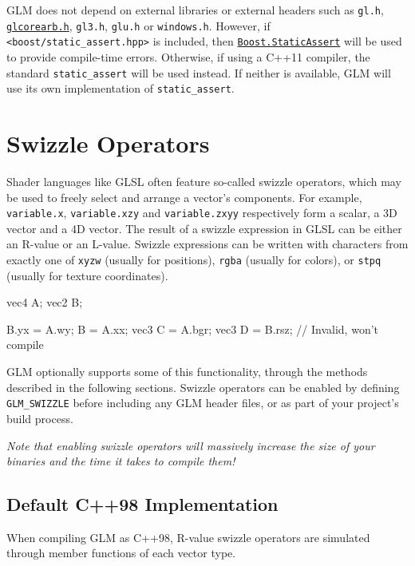\documentclass{scrartcl}
\numberwithin{figure}{subsection}
\begin{document}
GLM does not depend on external libraries or external headers such as \verb|gl.h|, \href{http://www.opengl.org/registry/api/GL/glcorearb.h}{\texttt{glcorearb.h}}, \verb|gl3.h|, \verb|glu.h| or \verb|windows.h|. However, if \verb|<boost/static_assert.hpp>| is included, then \href{http://www.boost.org/doc/libs/release/libs/static_assert/}{\texttt{Boost.StaticAssert}} will be used to provide compile-time errors.  Otherwise, if using a C++11 compiler, the standard \verb|static_assert| will be used instead. If neither is available, GLM will use its own implementation of \verb|static_assert|.

\newpage{}

\section{Swizzle Operators}

Shader languages like GLSL often feature so-called swizzle operators, which may be used to freely select and arrange a vector's components. For example, \verb|variable.x|, \verb|variable.xzy| and \verb|variable.zxyy| respectively form a scalar, a 3D vector and a 4D vector.  The result of a swizzle expression in GLSL can be either an R-value or an L-value. Swizzle expressions can be written with characters from exactly one of \verb|xyzw| (usually for positions), \verb|rgba| (usually for colors), or \verb|stpq| (usually for texture coordinates).

\begin{glslcode}
vec4 A;
vec2 B;

B.yx = A.wy;
B = A.xx;
vec3 C = A.bgr;
vec3 D = B.rsz; // Invalid, won't compile
\end{glslcode}

GLM optionally supports some of this functionality, through the methods described in the following sections. Swizzle operators can be enabled by defining \verb|GLM_SWIZZLE| before including any GLM header files, or as part of your project's build process.

\emph{Note that enabling swizzle operators will massively increase the size of your binaries and the time it takes to compile them!}

\subsection{Default C++98 Implementation}

When compiling GLM as C++98, R-value swizzle operators are simulated through member functions of each vector type.
\end{document}
